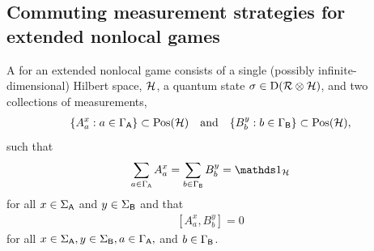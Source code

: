 
\subsection{Commuting measurement strategies for extended nonlocal games} \label{sec:commuting-measurement-strategies-extended-nonlocal-games}

A  for an extended nonlocal game consists of a single (possibly infinite-dimensional) Hilbert space, $\mathcal{H}$, a quantum state $\sigma \in \mathrm{D}(\mathcal{R} \otimes \mathcal{H})$, and two collections of measurements, 
\begin{align}
	\{ A_a^x : a \in \Gamma_{\mathsf{A}} \} \subset \mathrm{Pos}(\mathcal{H}) \quad \textnormal{and} \quad \{ B_b^y : b \in \Gamma_{\mathsf{B}} \} \subset \mathrm{Pos}(\mathcal{H}),
\end{align}
such that 
\begin{align}
	\sum_{a \in \GammaA} A_a^x = \sum_{b \in \GammaB} B_b^y = \I_{\H}
\end{align}
for all $x \in \Sigma_{\mathsf{A}}$ and $y \in \Sigma_{\mathsf{B}}$ and that
\begin{align}
	\left[ A_a^x, B_b^y \right] = 0
\end{align}
for all $x \in \Sigma_{\mathsf{A}}, y \in \Sigma_{\mathsf{B}}, a \in \Gamma_{\mathsf{A}},$ and $b \in \Gamma_{\mathsf{B}}$. 

